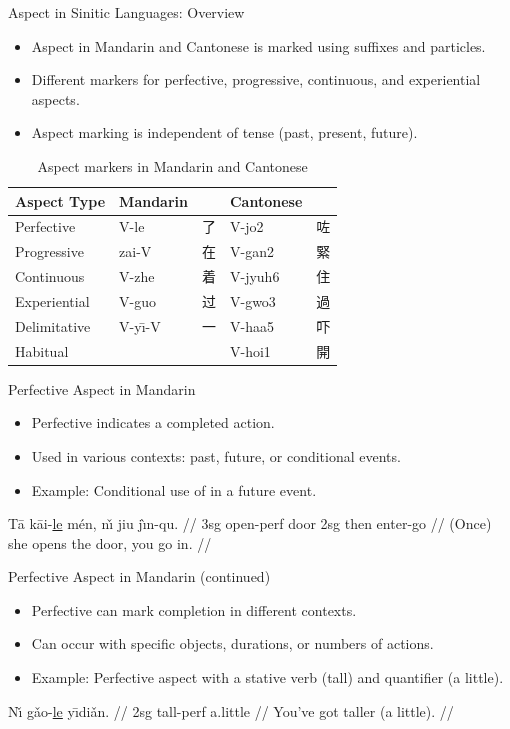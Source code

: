 \documentclass{beamer}
\newcommand{\cmn}{\mtciteform}
\newcommand{\ul}[1]{\uline{#1}}
\begin{document}
\begin{frame}{Aspect in Sinitic Languages: Overview}
\begin{itemize}
    \item Aspect in Mandarin and Cantonese is marked using suffixes and particles.
    \item Different markers for perfective, progressive, continuous, and experiential aspects.
    \item Aspect marking is independent of tense (past, present, future).
    \end{itemize}
    \begin{table}
\begin{tabular}{lllll}

\textbf{Aspect Type} & \textbf{Mandarin} &  & \textbf{Cantonese} & \\
\hline
Perfective   & V-le   & 了   & V-jo2   & 咗 \\
Progressive  & zai-V  & 在   & V-gan2  & 緊 \\
Continuous   & V-zhe  & 着   & V-jyuh6 & 住 \\
  Experiential & V-guo  & 过   & V-gwo3  & 過 \\
  Delimitative	& V-yı̄-V &一 & V-haa5  & 吓 \\
 Habitual	& & & V-hoi1 & 開 \\
\hline
\end{tabular}
\caption{Aspect markers in Mandarin and Cantonese}
\end{table}
\end{frame}

\begin{frame}{Perfective Aspect in Mandarin}
\begin{itemize}
    \item Perfective \cmn{le} indicates a completed action.
    \item Used in various contexts: past, future, or conditional events.
    \item Example: Conditional use of \cmn{le} in a future event.
\end{itemize}
\ex
\begingl
\gla Tā kāi-\ul{le} mén, nı̌ jiu jı̀n-qu. //
\glb 3sg open-perf door 2sg then enter-go //
\glft (Once) she opens the door, you go in. //
\endgl
\xe
\end{frame}

\begin{frame}{Perfective Aspect in Mandarin (continued)}
\begin{itemize}
    \item Perfective \cmn{le} can mark completion in different contexts.
    \item Can occur with specific objects, durations, or numbers of actions.
    \item Example: Perfective aspect with a stative verb (tall) and quantifier (a little).
\end{itemize}
\ex
\begingl
\gla Nı̌ gǎo-\ul{le} yı̄diǎn. //
\glb 2sg tall-perf a.little //
\glft You've got taller (a little). //
\endgl
\xe
\end{frame}
\end{document}
